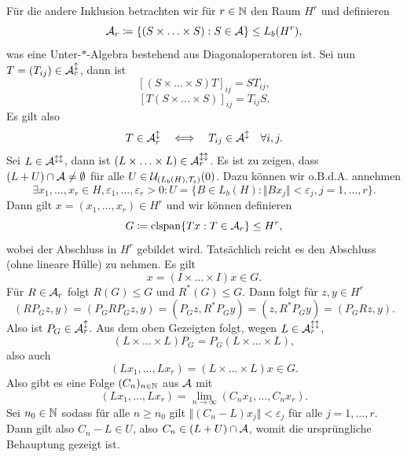 Für die andere Inklusion betrachten wir für $r \in \mathbb{N}$ den Raum $H^r$ und definieren
$$ \mathcal{A}_r \coloneqq \{ (S \times \hdots \times S) : S \in \mathcal{A} \} \leq L_b(H^r), $$
was eine Unter-$\ast$-Algebra bestehend aus Diagonaloperatoren ist. Sei nun $T = (T_{ij}) \in \mathcal{A}_r^\updownarrow$, dann ist
$$ [(S \times \hdots \times S) T]_{ij} = S T_{ij}, $$
$$ [T (S \times \hdots \times S)]_{ij} = T_{ij} S. $$
Es gilt also
$$ T \in \mathcal{A}_r^{\updownarrow} \quad\Longleftrightarrow\quad T_{ij} \in \mathcal{A}^{\updownarrow} \quad \forall i, j. $$
Sei $L \in \mathcal{A}^{\updownarrow\updownarrow}$, dann ist $(L \times \hdots \times L) \in \mathcal{A}_r^{\updownarrow\updownarrow}$. Es ist zu zeigen, dass $(L + U) \cap \mathcal{A} \neq \emptyset$ für alle $U \in \mathcal{U}_{(L_b(H), \mathcal{T}_s)}(0)$. Dazu können wir o.B.d.A. annehmen
$$ \exists x_1, \hdots, x_r \in H, \varepsilon_1, \hdots, \varepsilon_r > 0: U = \{ B \in L_b(H) : \Vert B x_j \Vert < \varepsilon_j, j = 1, \hdots, r \}. $$
Dann gilt $x = (x_1, \hdots, x_r) \in H^r$ und wir können definieren
$$ G \coloneqq \mathrm{clspan} \{ Tx : T \in \mathcal{A}_r \} \leq H^r, $$
wobei der Abschluss in $H^r$ gebildet wird. Tatsächlich reicht es den Abschluss (ohne lineare Hülle) zu nehmen. Es gilt
$$ x = (I \times \hdots \times I)x \in G. $$
Für $R \in \mathcal{A}_r$ folgt $R(G) \leq G$ und $R^*(G) \leq G$. Dann folgt für $z, y \in H^r$
$$ (R P_G z, y) = (P_G R P_G z, y) = (P_G z, R^* P_G y) = (z, R^* P_G y) = (P_G R z, y). $$
Also ist $P_G \in \mathcal{A}_r^\updownarrow$. Aus dem oben Gezeigten folgt, wegen $L \in \mathcal{A}_r^{\updownarrow\updownarrow}$,
$$ (L \times \hdots \times L) P_G = P_G (L \times \hdots \times L), $$
also auch
$$ (L x_1, \hdots, L x_r) = (L \times \hdots \times L) x \in G. $$
Also gibt es eine Folge $(C_n)_{n \in \mathbb{N}}$ aus $\mathcal{A}$ mit
$$ (L x_1, \hdots, L x_r) = \lim_{n \to \infty} (C_n x_1, \hdots, C_n x_r). $$
Sei $n_0 \in \mathbb{N}$ sodass für alle $n \geq n_0$ gilt $\Vert (C_n - L) x_j \Vert < \varepsilon_j$ für alle $j = 1, \hdots, r$.  Dann gilt also $C_n - L \in U$, also $C_n \in (L + U) \cap \mathcal{A}$, womit die ursprüngliche Behauptung gezeigt ist.